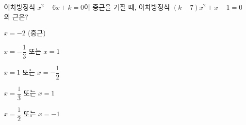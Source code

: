 이차방정식 $x^2-6x+k=0$이 중근을 가질 때, 이차방정식 $(k-7)x^2+x-1=0$의 근은?
\begin{choicesii}{\rule[-3ex]{0pt}{8ex}$x=-2$ (중근)}{\rule[-3ex]{0pt}{8ex}$x=-\dfrac{1}{3}$ 또는 $x=1$}{\rule[-3ex]{0pt}{8ex}$x=1$ 또는 $x=-\dfrac{1}{2}$}{\rule[-3ex]{0pt}{8ex}$x=\dfrac{1}{3}$ 또는 $x=1$}{\rule[-3ex]{0pt}{8ex}$x=\dfrac{1}{2}$ 또는 $x=-1$}\end{choicesii}
